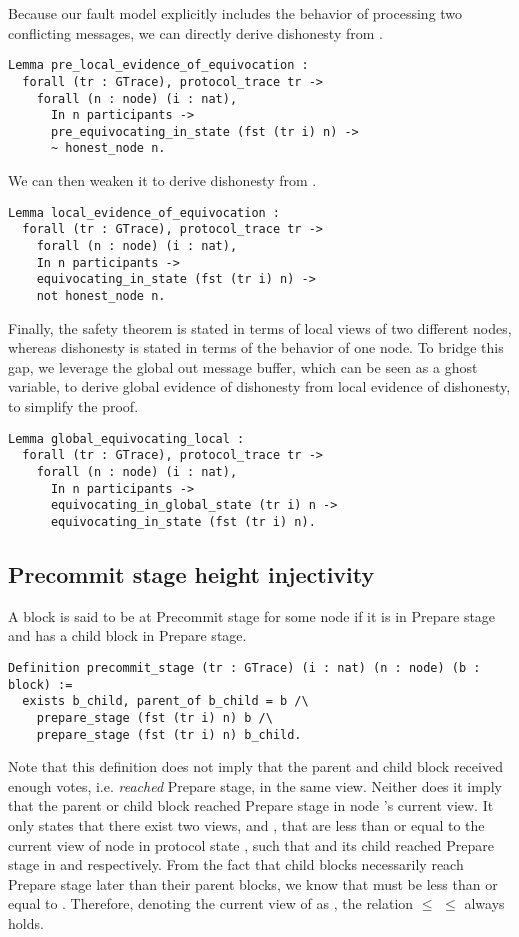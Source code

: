 \documentclass{easychair}
\begin{document}
Because our fault model explicitly includes the behavior of processing two conflicting  messages, we can directly derive dishonesty from . 
\begin{lstlisting}[language=Coq]
Lemma pre_local_evidence_of_equivocation :
  forall (tr : GTrace), protocol_trace tr ->
    forall (n : node) (i : nat),
      In n participants ->
      pre_equivocating_in_state (fst (tr i) n) ->
      ~ honest_node n.
\end{lstlisting}
We can then weaken it to derive dishonesty from . 
\begin{lstlisting}[language=Coq]
Lemma local_evidence_of_equivocation :
  forall (tr : GTrace), protocol_trace tr ->
    forall (n : node) (i : nat),
    In n participants ->
    equivocating_in_state (fst (tr i) n) ->
    not honest_node n.
\end{lstlisting}
\noindent
Finally, the safety theorem is stated in terms of local views of two different nodes, whereas dishonesty is stated in terms of the behavior of one node. To bridge this gap, we leverage the global out message buffer, which can be seen as a ghost variable, to derive global evidence of dishonesty from local evidence of dishonesty, to simplify the proof. 
\begin{lstlisting}[language=Coq]
Lemma global_equivocating_local :
  forall (tr : GTrace), protocol_trace tr ->
    forall (n : node) (i : nat),
      In n participants ->
      equivocating_in_global_state (tr i) n ->
      equivocating_in_state (fst (tr i) n).
\end{lstlisting}

\subsection{Precommit stage height injectivity}
A block is said to be at Precommit stage for some node if it is in Prepare stage and has a child block in Prepare stage. 
\begin{lstlisting}[language=Coq]
Definition precommit_stage (tr : GTrace) (i : nat) (n : node) (b : block) :=
  exists b_child, parent_of b_child = b /\
    prepare_stage (fst (tr i) n) b /\
    prepare_stage (fst (tr i) n) b_child.
\end{lstlisting}
Note that this definition does not imply that the parent and child block received enough votes, i.e. \textit{reached} Prepare stage, in the same view. Neither does it imply that the parent or child block reached Prepare stage in node 's current view. It only states that there exist two views,  and , that are less than or equal to the current view of node  in protocol state , such that  and its child reached Prepare stage in  and  respectively. From the fact that child blocks necessarily reach Prepare stage later than their parent blocks, we know that  must be less than or equal to . Therefore, denoting the current view of  as , the relation  $\leq$  $\leq$  always holds. 
\end{document}
